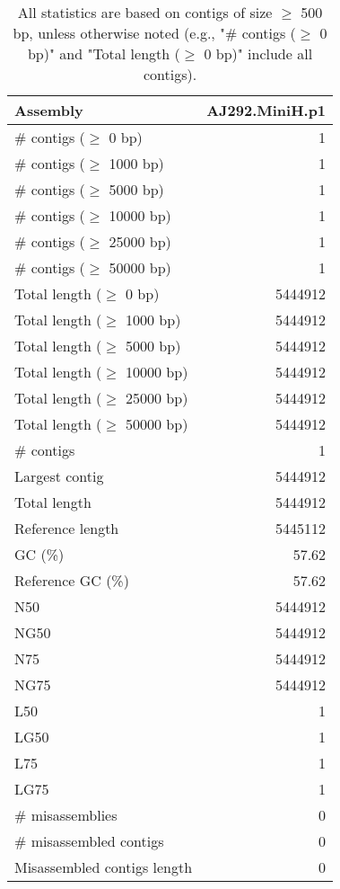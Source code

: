 \documentclass[12pt,a4paper]{article}
\begin{document}
\begin{table}[ht]
\begin{center}
\caption{All statistics are based on contigs of size $\geq$ 500 bp, unless otherwise noted (e.g., "\# contigs ($\geq$ 0 bp)" and "Total length ($\geq$ 0 bp)" include all contigs).}
\begin{tabular}{|l*{1}{|r}|}
\hline
Assembly & AJ292.MiniH.p1 \\ \hline
\# contigs ($\geq$ 0 bp) & 1 \\ \hline
\# contigs ($\geq$ 1000 bp) & 1 \\ \hline
\# contigs ($\geq$ 5000 bp) & 1 \\ \hline
\# contigs ($\geq$ 10000 bp) & 1 \\ \hline
\# contigs ($\geq$ 25000 bp) & 1 \\ \hline
\# contigs ($\geq$ 50000 bp) & 1 \\ \hline
Total length ($\geq$ 0 bp) & 5444912 \\ \hline
Total length ($\geq$ 1000 bp) & 5444912 \\ \hline
Total length ($\geq$ 5000 bp) & 5444912 \\ \hline
Total length ($\geq$ 10000 bp) & 5444912 \\ \hline
Total length ($\geq$ 25000 bp) & 5444912 \\ \hline
Total length ($\geq$ 50000 bp) & 5444912 \\ \hline
\# contigs & 1 \\ \hline
Largest contig & 5444912 \\ \hline
Total length & 5444912 \\ \hline
Reference length & 5445112 \\ \hline
GC (\%) & 57.62 \\ \hline
Reference GC (\%) & 57.62 \\ \hline
N50 & 5444912 \\ \hline
NG50 & 5444912 \\ \hline
N75 & 5444912 \\ \hline
NG75 & 5444912 \\ \hline
L50 & 1 \\ \hline
LG50 & 1 \\ \hline
L75 & 1 \\ \hline
LG75 & 1 \\ \hline
\# misassemblies & 0 \\ \hline
\# misassembled contigs & 0 \\ \hline
Misassembled contigs length & 0 \\ \hline

\end{tabular}
\end{center}
\end{table}
\end{document}
